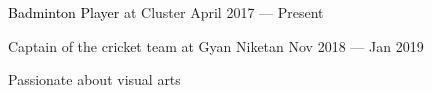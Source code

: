 {\textcolor{black}{Badminton Player}} at Cluster \hfill April 2017 --- Present

Captain of the cricket team at Gyan Niketan \hfill Nov 2018 --- Jan 2019

Passionate about visual arts


